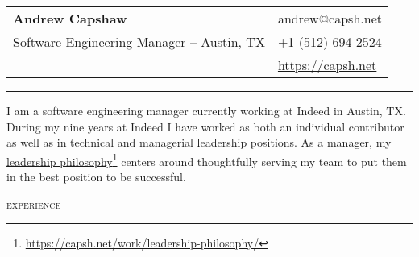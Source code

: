\documentclass[11pt]{amsart}
\begin{document}
\thispagestyle{empty}

\begin{tabularx}{\textwidth}{@{}Xl@{}}
 \textbf{Andrew Capshaw} & andrew@capsh.net \\
 Software Engineering Manager – Austin, TX & +1 (512) 694-2524 \\
& \href{https://capsh.net}{https://capsh.net} \\
\end{tabularx}
\bigskip

\bigskip
\hrule depth 0.5pt

\begingroup
\setlength{\tabcolsep}{10pt} %
\renewcommand{\arraystretch}{1.5} %

\bigskip

I am a software engineering manager currently working at Indeed in Austin, TX. During my nine years at Indeed I have worked as both an individual contributor as well as in technical and managerial leadership positions. As a manager, my \href{https://capsh.net/work/leadership-philosophy/}{leadership philosophy}\footnote{\url{https://capsh.net/work/leadership-philosophy/}} centers around thoughtfully serving my team to put them in the best position to be successful.

\bigskip
\textsc{experience}
\end{document}
